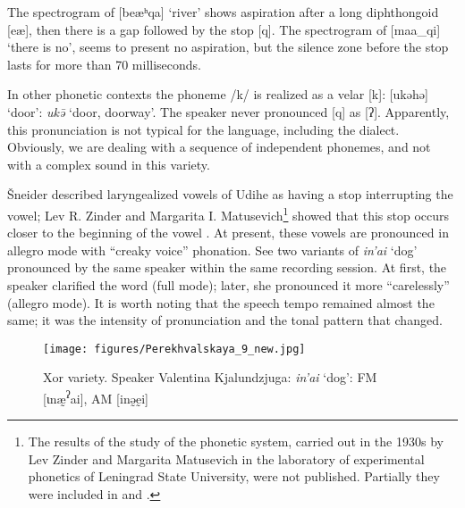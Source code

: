 \documentclass[output=paper,colorlinks,citecolor=brown]{langscibook}
\begin{document}
The spectrogram of [beæʰqa] ‘river’ shows aspiration after a long diphthongoid [eæ], then there is a gap followed by the stop [q]. The spectrogram of [maa\_qi] ‘there is no’, seems to present no aspiration, but the silence zone before the stop lasts for more than 70 milliseconds. 

In other phonetic contexts the phoneme /k/ is realized as a velar [k]: [uk{ə}h{ə}] ‘door’:  \textit{uk{ə̄}} ‘door, doorway’. The  speaker never pronounced [q] as [{ʔ}]. Apparently, this pronunciation is not typical for the  language, including the  dialect. Obviously, we are dealing with a sequence of independent phonemes, and not with a complex sound in this variety.


Šneider described laryngealized vowels of  Udihe as having a stop interrupting the vowel; Lev R. Zinder and Margarita I. Matusevich\footnote{The results of the study of the  phonetic system, carried out in the 1930s by Lev Zinder and Margarita Matusevich in the laboratory of experimental phonetics of Leningrad State University, were not published. Partially they were included in \citet{Zinder1948} and \citet{Kormushin1998}.} showed that this stop occurs closer to the beginning of the vowel \citep{Zinder1948}. At present, these vowels are pronounced in allegro mode with “creaky voice” phonation. See two variants of \textit{in’ai} ‘dog’ pronounced by the same speaker within the same recording session. At first, the speaker clarified the word (full mode); later, she pronounced it more “carelessly” (allegro mode). It is worth noting that the speech tempo remained almost the same; it was the intensity of pronunciation and the tonal pattern that changed. 


\begin{figure}
\texttt{[image: figures/Perekhvalskaya\_9\_new.jpg]}
\caption{Xor variety. Speaker Valentina Kjalundzjuga: \textit{in’ai} ‘dog’: FM [{ɩ}næ{̰}\textsuperscript{{ʔ}}ai], AM [in{ə}{̰}e{̰}i]}
\label{fig:7:9}
\end{figure}
\end{document}
